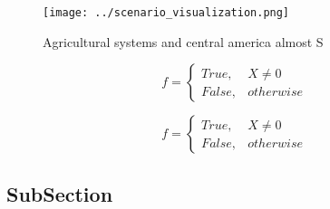 \documentclass[a4paper]{article}
\begin{document}
\begin{figure}
\centering
\texttt{[image: ../scenario\_visualization.png]}
\caption{Agricultural systems and central america almost S
}
\end{figure}
 
\begin{equation}   f =
\begin{cases} True, & X \neq 0\\
False, & otherwise
\end{cases}
\end{equation}

\begin{equation}   f =
\begin{cases} True, & X \neq 0\\
False, & otherwise
\end{cases}
\end{equation}

\subsection{SubSection}
\end{document}
